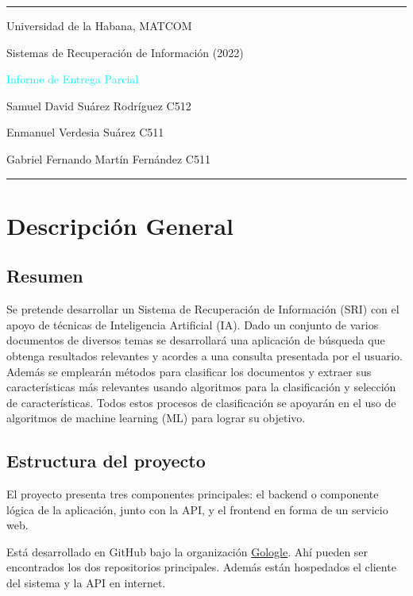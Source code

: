 \documentclass[12pt]{llncs}
\begin{document}
\begin{center}
\large{
\rule{\textwidth}{0.5pt}
\par Universidad de la Habana, MATCOM
\par Sistemas de Recuperación de Información (2022)
\vspace{0.4cm}
\par \textcolor{cyan}{Informe de Entrega Parcial}
\par Samuel David Suárez Rodríguez C512
\par Enmanuel Verdesia Suárez C511
\par Gabriel Fernando Martín Fernández C511
\rule{\textwidth}{1.5pt}
}

\end{center}

\section{Descripción General}
\vspace{0.5cm}
\subsection{Resumen}
\par Se pretende desarrollar un Sistema de Recuperación de Información (SRI) con el apoyo de técnicas de Inteligencia Artificial (IA). Dado un conjunto de varios documentos de diversos temas se desarrollará una aplicación de búsqueda que obtenga resultados relevantes y acordes a una consulta presentada por el usuario. Además se emplearán métodos para clasificar los documentos y extraer sus características más relevantes usando algoritmos para la clasificación y selección de características. Todos estos procesos de clasificación se apoyarán en el uso de algoritmos de machine learning (ML) para lograr su objetivo.

\subsection{Estructura del proyecto}
\par El proyecto presenta tres componentes principales: el backend o componente lógica de la aplicación, junto con la API, y el frontend en forma de un servicio web.

Está desarrollado en GitHub bajo la organización \href{https://github.com/Gologle}{\color{blue}Gologle}. Ahí pueden ser encontrados los dos repositorios principales. Además están hospedados el cliente del sistema y la API en internet.
\end{document}
